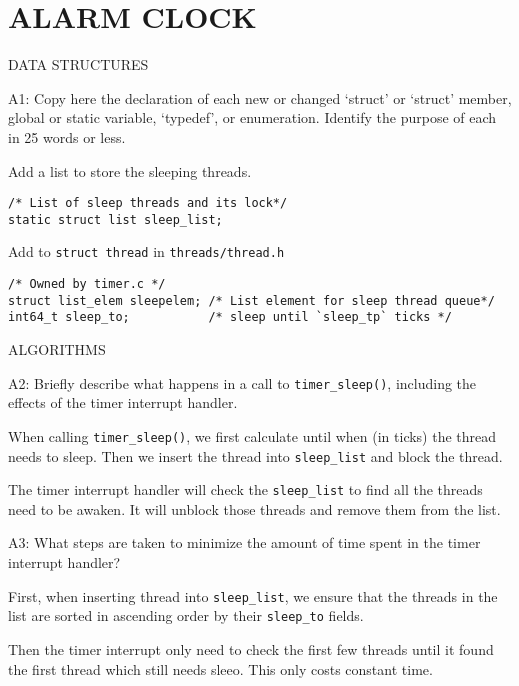 
\section{ALARM CLOCK}

\begin{aspect}{DATA STRUCTURES}
	\begin{qc}
		A1: Copy here the declaration of each new or changed `struct' or
		`struct' member, global or static variable, `typedef', or
		enumeration.  Identify the purpose of each in 25 words or less.
	\end{qc}
	Add a list to store the sleeping threads.
	\begin{lstlisting}
/* List of sleep threads and its lock*/
static struct list sleep_list;
  \end{lstlisting}
	Add to \lstinline{struct thread} in \lstinline{threads/thread.h}
	\begin{lstlisting}
/* Owned by timer.c */
struct list_elem sleepelem; /* List element for sleep thread queue*/
int64_t sleep_to;           /* sleep until `sleep_tp` ticks */
  \end{lstlisting}
\end{aspect}
\begin{aspect}{ALGORITHMS}
	\begin{qc}
		A2: Briefly describe what happens in a call to \lstinline{timer_sleep()}, including the effects of the timer interrupt handler.
	\end{qc}
	When calling \lstinline{timer_sleep()}, we first calculate until when (in ticks) the thread needs to sleep. Then we insert the thread into \lstinline{sleep_list} and block the thread.

	The timer interrupt handler will check the \lstinline{sleep_list} to find all the threads need to be awaken. It will unblock those threads and remove them from the list.

	\begin{qc}
		A3: What steps are taken to minimize the amount of time spent in the timer interrupt handler?
	\end{qc}

	First, when inserting thread into \lstinline{sleep_list}, we ensure that the threads in the list are sorted in ascending order by their \lstinline{sleep_to} fields.

	Then the timer interrupt only need to check the first few threads until it found the first thread which still needs sleeo. This only costs constant time.
\end{aspect}

